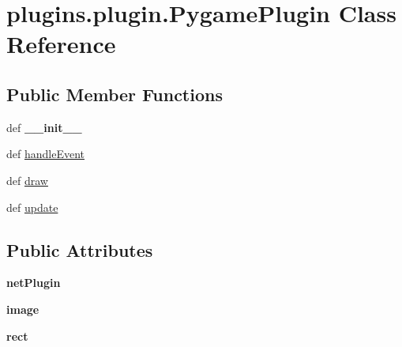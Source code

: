\hypertarget{classplugins_1_1plugin_1_1_pygame_plugin}{\section{plugins.\-plugin.\-Pygame\-Plugin \-Class \-Reference}
\label{classplugins_1_1plugin_1_1_pygame_plugin}
}
\subsection*{\-Public \-Member \-Functions}
\begin{DoxyCompactItemize}
\item 
\hypertarget{classplugins_1_1plugin_1_1_pygame_plugin_a883e10c5bea4b72d2674b5b3a0715a6f}{def {\bfseries \-\_\-\-\_\-init\-\_\-\-\_\-}}\label{classplugins_1_1plugin_1_1_pygame_plugin_a883e10c5bea4b72d2674b5b3a0715a6f}

\item 
def \hyperlink{classplugins_1_1plugin_1_1_pygame_plugin_ad1780000a3ee47c8c239612ff4fa9d74}{handle\-Event}
\item 
def \hyperlink{classplugins_1_1plugin_1_1_pygame_plugin_a459513cbe6410dd4743c54adad4416de}{draw}
\item 
def \hyperlink{classplugins_1_1plugin_1_1_pygame_plugin_a9cc79e76b41cff27bbdc6a4e23c5febc}{update}
\end{DoxyCompactItemize}
\subsection*{\-Public \-Attributes}
\begin{DoxyCompactItemize}
\item 
\hypertarget{classplugins_1_1plugin_1_1_pygame_plugin_add14cfc41c87ebbe8a6023c4e3c2d3aa}{{\bfseries net\-Plugin}}\label{classplugins_1_1plugin_1_1_pygame_plugin_add14cfc41c87ebbe8a6023c4e3c2d3aa}

\item 
\hypertarget{classplugins_1_1plugin_1_1_pygame_plugin_af23330154421938d139ad55579b1257b}{{\bfseries image}}\label{classplugins_1_1plugin_1_1_pygame_plugin_af23330154421938d139ad55579b1257b}

\item 
\hypertarget{classplugins_1_1plugin_1_1_pygame_plugin_abeeaffe2ad0e6269f2bc3af25d00117a}{{\bfseries rect}}\label{classplugins_1_1plugin_1_1_pygame_plugin_abeeaffe2ad0e6269f2bc3af25d00117a}

\end{DoxyCompactItemize}


